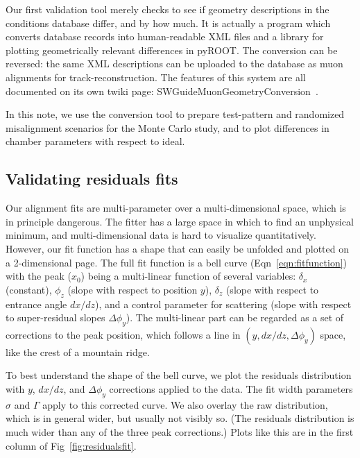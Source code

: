 \documentclass[12pt]{article}
\begin{document}
Our first validation tool merely checks to see if geometry
descriptions in the conditions database differ, and by how much.  It
is actually a program which converts database records into
human-readable XML files and a library for plotting geometrically
relevant differences in pyROOT.  The conversion can be reversed: the
same XML descriptions can be uploaded to the database as muon
alignments for track-reconstruction.  The features of this system are
all documented on its own twiki page:
SWGuideMuonGeometryConversion~\cite{SWGuideMuonGeometryConversion}.

In this note, we use the conversion tool to prepare test-pattern and
randomized misalignment scenarios for the Monte Carlo study, and to
plot differences in chamber parameters with respect to ideal.

\subsection{Validating residuals fits}

Our alignment fits are multi-parameter over a multi-dimensional space,
which is in principle dangerous.  The fitter has a large space in
which to find an unphysical minimum, and multi-dimensional data is
hard to visualize quantitatively.  However, our fit function has a
shape that can easily be unfolded and plotted on a 2-dimensional page.
The full fit function is a bell curve (Eqn~\ref{eqn:fitfunction}) with
the peak ($x_0$) being a multi-linear function of several variables:
$\delta_x$ (constant), $\phi_z$ (slope with respect to position $y$),
$\delta_z$ (slope with respect to entrance angle $dx/dz$), and a
control parameter for scattering (slope with respect to
super-residual slopes $\Delta \phi_y$).  The multi-linear part can be
regarded as a set of corrections to the peak position, which follows a
line in $(y, dx/dz, \Delta \phi_y)$ space, like the crest of a
mountain ridge.

To best understand the shape of the bell curve, we plot the residuals
distribution with $y$, $dx/dz$, and $\Delta \phi_y$ corrections
applied to the data.  The fit width parameters $\sigma$ and $\Gamma$
apply to this corrected curve.  We also overlay the raw distribution,
which is in general wider, but usually not visibly so.  (The residuals
distribution is much wider than any of the three peak corrections.)
Plots like this are in the first column of Fig~\ref{fig:residualsfit}.
\end{document}
